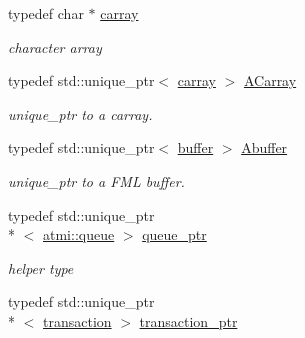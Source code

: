 \begin{DoxyCompactItemize}
\item 
\hypertarget{group__fml_ga8b57f9a4e2453d8e5d82ac0016e35e87}{typedef char $\ast$ \hyperlink{group__fml_ga8b57f9a4e2453d8e5d82ac0016e35e87}{carray}}\label{group__fml_ga8b57f9a4e2453d8e5d82ac0016e35e87}

\begin{DoxyCompactList}\small\item\em character array \end{DoxyCompactList}\item 
\hypertarget{group__fml_ga095330dfead97321f0830e3fa204a24a}{typedef std\+::unique\+\_\+ptr$<$ \hyperlink{group__fml_ga8b57f9a4e2453d8e5d82ac0016e35e87}{carray} $>$ \hyperlink{group__fml_ga095330dfead97321f0830e3fa204a24a}{A\+Carray}}\label{group__fml_ga095330dfead97321f0830e3fa204a24a}

\begin{DoxyCompactList}\small\item\em unique\+\_\+ptr to a carray. \end{DoxyCompactList}\item 
\hypertarget{group__fml_gaa6276ba0b9cf18dd00fae53b1ce132f4}{typedef std\+::unique\+\_\+ptr$<$ \hyperlink{classatmi_1_1buffer}{buffer} $>$ \hyperlink{group__fml_gaa6276ba0b9cf18dd00fae53b1ce132f4}{Abuffer}}\label{group__fml_gaa6276ba0b9cf18dd00fae53b1ce132f4}

\begin{DoxyCompactList}\small\item\em unique\+\_\+ptr to a F\+M\+L buffer. \end{DoxyCompactList}\item 
\hypertarget{group__atmi_ga7cfd5961e0e05b148f12be311177a1a8}{typedef std\+::unique\+\_\+ptr\\*
$<$ \hyperlink{classatmi_1_1queue}{atmi\+::queue} $>$ \hyperlink{group__atmi_ga7cfd5961e0e05b148f12be311177a1a8}{queue\+\_\+ptr}}\label{group__atmi_ga7cfd5961e0e05b148f12be311177a1a8}

\begin{DoxyCompactList}\small\item\em helper type \end{DoxyCompactList}\item 
\hypertarget{group__atmi_gab8e359f2305eaf285b0b0745d3b41997}{typedef std\+::unique\+\_\+ptr\\*
$<$ \hyperlink{classatmi_1_1transaction}{transaction} $>$ \hyperlink{group__atmi_gab8e359f2305eaf285b0b0745d3b41997}{transaction\+\_\+ptr}}\label{group__atmi_gab8e359f2305eaf285b0b0745d3b41997}


\end{DoxyCompactItemize}
